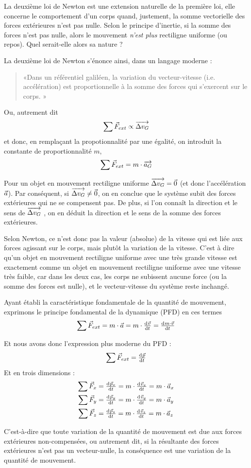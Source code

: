 \documentclass[11pt,a4paper]{article}
\begin{document}
La deuxième loi de Newton est une extension naturelle de la première loi, elle concerne le comportement d’un corps quand, justement, la somme vectorielle des forces extérieures n’est pas nulle.  Selon le principe d’inertie, si la somme des forces n’est pas nulle, alors le mouvement \textit{n’est plus} rectiligne uniforme (ou repos).  Quel serait-elle alors sa nature ?

La deuxième loi de Newton s’énonce ainsi, dans un langage moderne :
\begin{quote}
«Dans un référentiel galiléen, la variation du vecteur-vitesse (i.e. accélération) est proportionnelle à la somme des forces qui s’exercent sur le corps. »
\end{quote}

Ou, autrement dit 
\[
\sum \vec{F}_{ext} \propto \overrightarrow{\Delta v_G}
\]
et donc, en remplaçant la propotionnalité par une égalité, on introduit la constante de proportionnalité $m$, 
\[
\sum \vec{F}_{ext} = m\cdot\overrightarrow{a_G}
\]

Pour un objet en mouvement rectiligne uniforme $\overrightarrow{\Delta v_G}=\Vec{0}$ (et donc l’accélération $\vec{a}$). Par conséquent, si $\overrightarrow{\Delta v_G}\ne\Vec{0}$, on en conclue que le système subit des forces extérieures qui ne se compensent pas.  De plus, si l'on connaît la direction et le sens de $\overrightarrow{\Delta v_G}$ , on en déduit la direction et le sens de la somme des forces extérieures.  

Selon Newton, ce n’est donc pas la valeur (absolue) de la vitesse qui est liée aux forces agissant sur le corps, mais plutôt la variation de la vitesse.  C'est à dire qu'un objet en mouvement rectiligne uniforme avec une très grande vitesse est exactement comme un objet en mouvement rectiligne uniforme avec une vitesse très faible, car dans les deux cas, les corps ne subissent aucune force (ou la somme des forces est nulle), et le vecteur-vitesse du système reste inchangé. 

Ayant établi la caractéristique fondamentale de la quantité de mouvement, exprimons le principe fondamental de la dynamique (PFD) en ces termes 
\[
\sum \vec{F}_{ext} = m\cdot\va = m\cdot\od{\vv}{t} = \od{m\cdot\vv}{t}
\]
\begin{shaded}
Et nous avons donc l'expression plus moderne du PFD : 
\[
\sum \vec{F}_{ext} = \od{\vp}{t}
\]
Et en trois dimensions : 
\begin{align*}
   \sum \vec{F}_x &= \od{\vp_x}{t} = m\cdot\od{\vv_x}{t} = m\cdot\va_x \\
   \sum \vec{F}_y &= \od{\vp_y}{t} = m\cdot\od{\vv_y}{t} = m\cdot\va_y \\
   \sum \vec{F}_z &= \od{\vp_z}{t} = m\cdot\od{\vv_z}{t} = m\cdot\va_z 
\end{align*}
\end{shaded}
C’est-à-dire que toute variation de la quantité de mouvement est due aux forces extérieures non-compensées, ou autrement dit, si la résultante des forces extérieures n’est pas un vecteur-nulle, la conséquence est une variation de la quantité de mouvement.  
\end{document}
